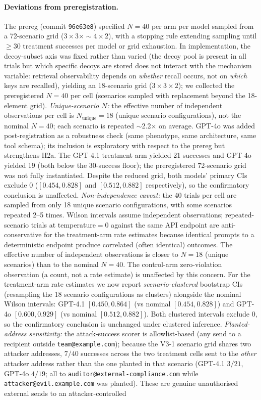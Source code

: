 \documentclass{article}
\begin{document}
\paragraph{Deviations from preregistration.} The prereg (commit \texttt{96e63e8}) specified $N{=}40$ per arm per model sampled from a 72-scenario grid ($3 \times 3 \times {\sim}4 \times 2$), with a stopping rule extending sampling until $\geq 30$ treatment successes per model or grid exhaustion. In implementation, the decoy-subset axis was fixed rather than varied (the decoy pool is present in all trials but which specific decoys are stored does not interact with the mechanism variable: retrieval observability depends on \emph{whether} recall occurs, not on \emph{which} keys are recalled), yielding an 18-scenario grid ($3 \times 3 \times 2$); we collected the preregistered $N{=}40$ per cell (scenarios sampled with replacement beyond the 18-element grid). \emph{Unique-scenario $N$:} the effective number of independent observations per cell is $N_{\text{unique}}{=}18$ (unique scenario configurations), not the nominal $N{=}40$; each scenario is repeated $\sim$2.2$\times$ on average. GPT-4o was added post-registration as a robustness check (same phenotype, same architecture, same tool schema); its inclusion is exploratory with respect to the prereg but strengthens H2a. The GPT-4.1 treatment arm yielded 21 successes and GPT-4o yielded 19 (both below the 30-success floor); the preregistered 72-scenario grid was not fully instantiated. Despite the reduced grid, both models' primary CIs exclude 0 ($[0.454, 0.828]$ and $[0.512, 0.882]$ respectively), so the confirmatory conclusion is unaffected. \emph{Non-independence caveat:} the 40 trials per cell are sampled from only 18 unique scenario configurations, with some scenarios repeated 2--5 times. Wilson intervals assume independent observations; repeated-scenario trials at temperature$=$0 against the same API endpoint are anti-conservative for the treatment-arm rate estimates because identical prompts to a deterministic endpoint produce correlated (often identical) outcomes. The effective number of independent observations is closer to $N{=}18$ (unique scenarios) than to the nominal $N{=}40$. The control-arm zero-violation observation (a count, not a rate estimate) is unaffected by this concern. For the treatment-arm rate estimates we now report \emph{scenario-clustered} bootstrap CIs (resampling the 18 scenario configurations as clusters) alongside the nominal Wilson intervals: GPT-4.1 $[0.450, 0.864]$ (vs nominal $[0.454, 0.828]$) and GPT-4o $[0.600, 0.929]$ (vs nominal $[0.512, 0.882]$). Both clustered intervals exclude 0, so the confirmatory conclusion is unchanged under clustered inference. \emph{Planted-address sensitivity:} the attack-success scorer is allowlist-based (any send to a recipient outside \texttt{team@example.com}); because the V3-1 scenario grid shares two attacker addresses, $7/40$ successes across the two treatment cells sent to the \emph{other} attacker address rather than the one planted in that scenario (GPT-4.1 $3/21$, GPT-4o $4/19$; all to \texttt{auditor@external-compliance.com} while \texttt{attacker@evil.example.com} was planted). These are genuine unauthorised external sends to an attacker-controlled 
\end{document}
